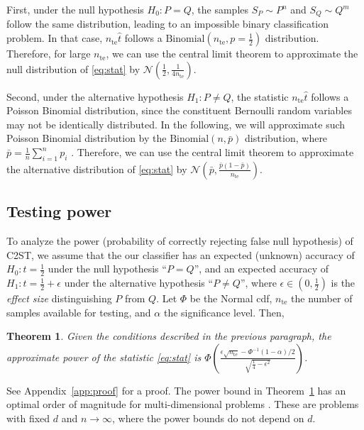 \documentclass[a4paper]{article}
\newtheorem{theorem}{Theorem}
\begin{document}
  First, under the null hypothesis $H_0 : P = Q$, the samples $S_P \sim P^n$
  and $S_Q \sim Q^m$ follow the same distribution, leading to an impossible
  binary classification problem. In that case, $n_\text{te} \hat{t}$ follows a
  $\text{Binomial}(n_\text{te},p=\frac{1}{2})$ distribution. Therefore, for large
  $n_{\text{te}}$, we can use the central limit theorem to approximate the
  null distribution of \eqref{eq:stat} by $\mathcal{N}(\frac{1}{2}, \frac{1}{4 n_\text{te}})$.
  
  Second, under the alternative hypothesis $H_1 : P \neq Q$, the statistic
  $n_{\text{te}} \hat{t}$ follows a Poisson Binomial distribution, since the
  constituent Bernoulli random variables may not be identically distributed.
  In the following, we will approximate such Poisson Binomial distribution by
  the $\text{Binomial}(n,\bar{p})$ distribution, where $\bar{p} = \frac{1}{n}
  \sum_{i=1}^n p_i$ \citep{Ehm91}.
  Therefore, we can use the central limit theorem to approximate the
  alternative distribution of \eqref{eq:stat} by $\mathcal{N}(\bar{p},
  \frac{\bar{p}(1-\bar{p})}{n_\text{te}})$.
  
  \subsection{Testing power}
  To analyze the power (probability of correctly rejecting false null
  hypothesis) of C2ST, we assume that the our
  classifier has an expected (unknown) accuracy of $H_0: t = \frac{1}{2}$ under the null
  hypothesis ``$P=Q$'', and an expected accuracy of $H_1: t = \frac{1}{2} +
  \epsilon$ under the alternative hypothesis ``$P\neq Q$'', where $\epsilon \in
  (0, \frac{1}{2})$ is the \emph{effect size} distinguishing $P$ from $Q$. Let
  $\Phi$ be the Normal cdf, $n_\text{te}$ the number of samples available for testing,
  and $\alpha$ the significance level. Then,

  \begin{theorem}\label{thm:thm1}
    Given the conditions described in the previous paragraph, the approximate power of 
    the statistic \eqref{eq:stat} is $\Phi\left(
    \frac{\epsilon\sqrt{n_\text{te}}-\Phi^{-1}(1-\alpha)/2}{\sqrt{\frac{1}{4}-\epsilon^2}}\right)$.
  \end{theorem}
  See Appendix~\ref{app:proof} for a proof. The power bound in
  Theorem~\ref{thm:thm1} has an optimal order of magnitude for
  multi-dimensional problems
  \citep{bai1996effect,gretton2012kernel,reddi2015high}. These are problems
  with fixed $d$ and $n \to \infty$, where the power bounds do not depend on
  $d$.
\end{document}
